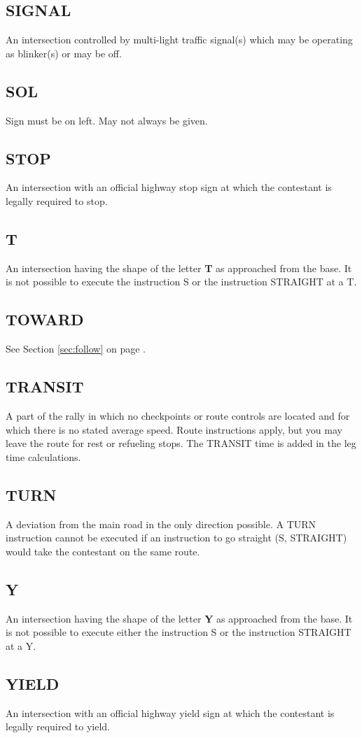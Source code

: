 \subsection{SIGNAL}
An intersection controlled by multi-light traffic signal(s) which may be operating as blinker(s) or may be off.

\subsection{SOL}
Sign must be on left.  May not always be given.

\subsection{STOP}
An intersection with an official highway stop sign at which the contestant is legally required to stop.

\subsection{T}
An intersection having the shape of the letter \textbf{T} as approached from the base.  It is not possible to execute the instruction S or the instruction STRAIGHT at a T.

\subsection{TOWARD}
See Section \ref{sec:follow} on page \pageref{sec:follow}.

\subsection{TRANSIT}
A part of the rally in which no checkpoints or route controls are located and for which there is no stated average speed.  Route instructions apply, but you may leave the route for rest or refueling stops.  The TRANSIT time is added in the leg time calculations.

\subsection{TURN}
A deviation from the main road in the only direction possible.  A TURN instruction cannot be executed if an instruction to go straight (S, STRAIGHT) would take the contestant on the same route.

\subsection{Y}
An intersection having the shape of the letter \textbf{Y} as approached from the base.  It is not possible to execute either the instruction S or the instruction STRAIGHT at a Y.

\subsection{YIELD}
An intersection with an official highway yield sign at which the contestant is legally required to yield.